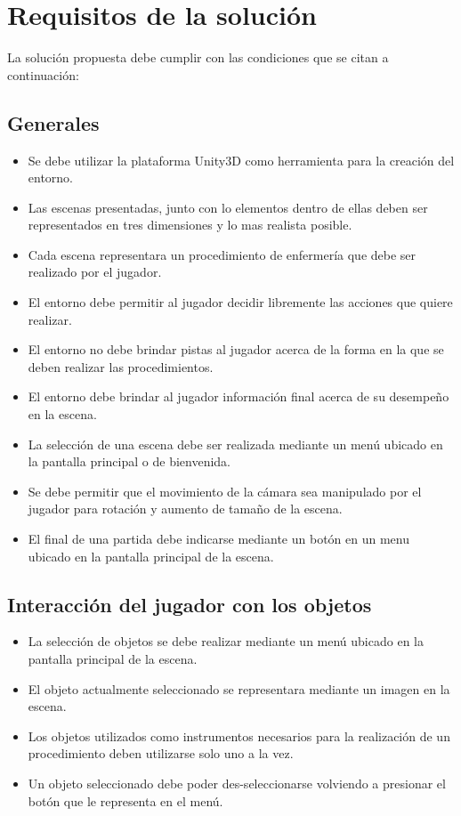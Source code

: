 \section{Requisitos de la solución}
\label{sec:problema_requisitos}

La solución propuesta debe cumplir con las condiciones que se citan a continuación:

\subsection{Generales}
\begin{itemize}
\item Se debe utilizar la plataforma Unity3D como herramienta para la creación del entorno.
\item Las escenas presentadas, junto con lo elementos dentro de ellas deben ser representados en tres dimensiones y
lo mas realista posible.
\item Cada escena representara un procedimiento de enfermería que debe ser realizado por el jugador.
\item El entorno debe permitir al jugador decidir libremente las acciones que quiere realizar.
\item El entorno no debe brindar pistas al jugador acerca de la forma en la que se deben realizar las procedimientos.
\item El entorno debe brindar al jugador información final acerca de su desempeño en la escena.
\item La selección de una escena debe ser realizada mediante un menú ubicado en la pantalla principal o de bienvenida.
\item Se debe permitir que el movimiento de la cámara sea manipulado por el jugador para rotación y aumento de tamaño de la escena.
\item El final de una partida debe indicarse mediante un botón en un menu ubicado en la pantalla principal de la escena.
\end{itemize}

\subsection{Interacción del jugador con los objetos}
\begin{itemize}
\item La selección de objetos se debe realizar mediante un menú ubicado en la pantalla principal de la escena.
\item El objeto actualmente seleccionado se representara mediante un imagen en la escena.
\item Los objetos utilizados como instrumentos necesarios para la realización de un procedimiento deben
utilizarse solo uno a la vez.
\item Un objeto seleccionado debe poder des-seleccionarse volviendo a presionar el botón que le representa en el 
menú.
\end{itemize}

